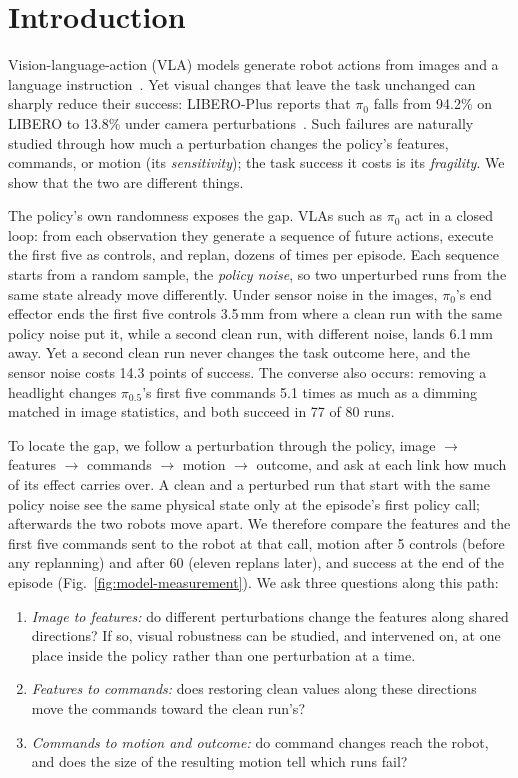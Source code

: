 \section{Introduction}

Vision-language-action (VLA) models generate robot actions from images and a language instruction~\cite{brohan2023rt2,kim2024openvla,pi0,pi05}. Yet visual changes that leave the task unchanged can sharply reduce their success: LIBERO-Plus reports that $\pi_0$ falls from 94.2\% on LIBERO to 13.8\% under camera perturbations~\cite{fei2026liberoplus}. Such failures are naturally studied through how much a perturbation changes the policy's features, commands, or motion (its \emph{sensitivity}); the task success it costs is its \emph{fragility}. We show that the two are different things.

The policy's own randomness exposes the gap. VLAs such as $\pi_0$ act in a closed loop: from each observation they generate a sequence of future actions, execute the first five as controls, and replan, dozens of times per episode. Each sequence starts from a random sample, the \emph{policy noise}, so two unperturbed runs from the same state already move differently. Under sensor noise in the images, $\pi_0$'s end effector ends the first five controls 3.5\,mm from where a clean run with the same policy noise put it, while a second clean run, with different noise, lands 6.1\,mm away. Yet a second clean run never changes the task outcome here, and the sensor noise costs 14.3 points of success. The converse also occurs: removing a headlight changes $\pi_{0.5}$'s first five commands 5.1 times as much as a dimming matched in image statistics, and both succeed in 77 of 80 runs.

To locate the gap, we follow a perturbation through the policy, image $\to$ features $\to$ commands $\to$ motion $\to$ outcome, and ask at each link how much of its effect carries over. A clean and a perturbed run that start with the same policy noise see the same physical state only at the episode's first policy call; afterwards the two robots move apart. We therefore compare the features and the first five commands sent to the robot at that call, motion after 5 controls (before any replanning) and after 60 (eleven replans later), and success at the end of the episode (Fig.~\ref{fig:model-measurement}). We ask three questions along this path:
\begin{enumerate}
\item \emph{Image to features:} do different perturbations change the features along shared directions? If so, visual robustness can be studied, and intervened on, at one place inside the policy rather than one perturbation at a time.
\item \emph{Features to commands:} does restoring clean values along these directions move the commands toward the clean run's?
\item \emph{Commands to motion and outcome:} do command changes reach the robot, and does the size of the resulting motion tell which runs fail?
\end{enumerate}

